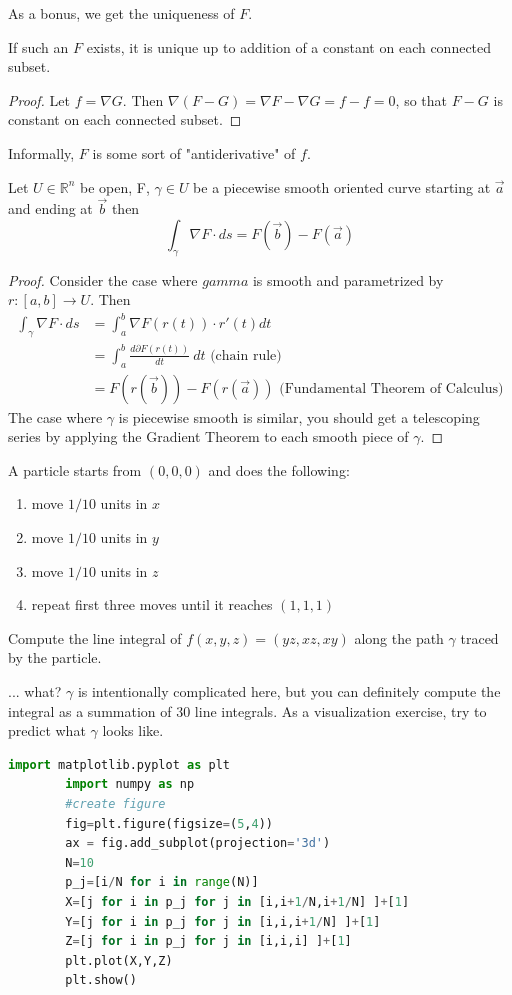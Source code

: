 \documentclass[11pt,openany]{book}
\newcommand{\proposition}[1]{\begin{tcolorbox}[title=Proposition,colframe=red!50!blue!20!white,colback=red!35!blue!10!white, coltitle=black]{#1}\end{tcolorbox}
}
\newcommand{\theorem}[2]{\begin{tcolorbox}[title=Theorem ({#1}),colframe=red!70!black,colback=red!5!white]{#2}\end{tcolorbox}
}
\newcommand{\example}[1]{\begin{tcolorbox}[title=Example,colframe=yellow!50!white,colback=yellow!20!white,coltitle=black]{#1}\end{tcolorbox}
}
\begin{document}
	
	As a bonus, we get the uniqueness of $F$.
	\proposition{
		If such an $F$ exists, it is unique up to addition of a constant on each connected subset.
	}
	
	\begin{proof}
		Let $f=\nabla G$. Then $\nabla(F-G)=\nabla F - \nabla G = f-f =0$, so that $F-G$ is constant on each connected subset.
	\end{proof}
	Informally, $F$ is some sort of "antiderivative" of $f$.
	\theorem{Gradient}{
		Let $U\in\mathbb{R}^n$ be open, F, $\gamma\in U$ be a piecewise smooth oriented curve starting at $\vec{a}$ and ending at $\vec{b}$
		then \[
		\int_\gamma \nabla F \cdot ds = F(\vec{b})-F(\vec{a})
		\]
	}
	\begin{proof}
		Consider the case where $gamma$ is smooth and parametrized by $r:[a,b]\to U$. Then
		\begin{align*}
			\int_\gamma \nabla F \cdot ds &= \int_a^b \nabla F(r(t)) \cdot r'(t) dt \\
			&= \int_a^b \frac{d \partial F(r(t))}{dt} \ dt \textrm{ (chain rule)}\\
			&= F(r(\vec{b})) - F(r(\vec{a})) \textrm{ (Fundamental Theorem of Calculus)}
		\end{align*} 
		The case where $\gamma$ is piecewise smooth is similar, you should get a telescoping series by applying the Gradient Theorem to each smooth piece of $\gamma$.
	\end{proof}
	\example{
		A particle starts from $(0,0,0)$ and does the following:
		\begin{enumerate}
			\item move $1/10$ units in $x$
			\item move $1/10$ units in $y$
			\item move $1/10$ units in $z$
			\item repeat first three moves until it reaches $(1,1,1)$
		\end{enumerate}
		Compute the line integral of $f(x,y,z)= (yz,xz,xy)$ along the path $\gamma$ traced by the particle.
	}
	... what? $\gamma$ is intentionally complicated here, but you can definitely compute the integral as a summation of $30$ line integrals.
	As a visualization exercise, try to predict what $\gamma$ looks like.
	
	\begin{lstlisting}[language=Python]
		import matplotlib.pyplot as plt
		import numpy as np
		#create figure
		fig=plt.figure(figsize=(5,4))
		ax = fig.add_subplot(projection='3d')
		N=10
		p_j=[i/N for i in range(N)]
		X=[j for i in p_j for j in [i,i+1/N,i+1/N] ]+[1]
		Y=[j for i in p_j for j in [i,i,i+1/N] ]+[1]
		Z=[j for i in p_j for j in [i,i,i] ]+[1]
		plt.plot(X,Y,Z)
		plt.show()
	\end{lstlisting}
	
\end{document}
